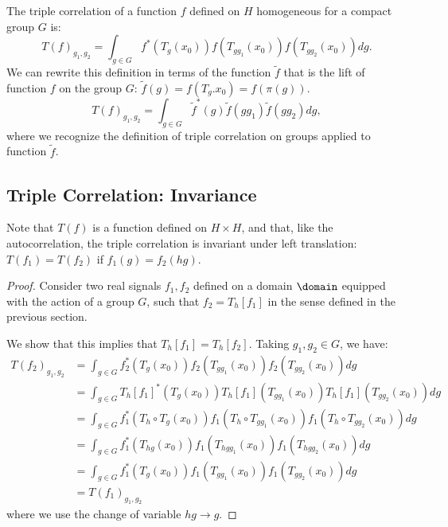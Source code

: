 \documentclass{article}
\begin{document}
The triple correlation of a function $f$ defined on $H$ homogeneous for a compact group $G$ is:
\begin{equation}
    T(f)_{g_1, g_2}
        =
        \int_{g \in G}
        f^*(T_g(x_0))
        f\left(T_{g g_1}(x_0)\right) f\left(T_{g g_2}(x_0)\right)
        dg .
\end{equation}
We can rewrite this definition in terms of the function $\tilde f$ that is the lift of function $f$ on the group $G$: $\tilde{f}(g) = f(T_g.x_0) = f(\pi(g))$.
\begin{equation}
    T(f)_{g_1, g_2}
        =
        \int_{g \in G}
        \tilde{f}^*(g)
        \tilde{f}(gg_1) \tilde{f}(gg_2)
        dg ,
\end{equation}
where we recognize the definition of triple correlation on groups applied to function $\tilde{f}$.

\subsection{Triple Correlation: Invariance}
Note that $T(f)$ is a function defined on $H \times H$, and that, like the autocorrelation, the triple correlation is invariant under left translation: $T(f_1)=T(f_2)$ if $f_1(g)=f_2(h g)$.

\begin{proof}
Consider two real signals $f_1, f_2$ defined on a domain $\domain$ equipped with the action of a group $G$, such that $f_2 = T_h[f_1]$ in the sense defined in the previous section.

We show that this implies that $T_h[f_1] = T_h[f_2] $. Taking $g_1, g_2 \in G$, we have:
\begin{align*}
    T(f_2)_{g_1, g_2}
        &= \int_{g \in G}
            f_2^*(T_g(x_0)) f_2\left(T_{g g_1}(x_0)\right) f_2\left(T_{g g_2}(x_0)\right) dg  \\
        &= \int_{g \in G}
            T_h[f_1]^*(T_g(x_0)) T_h[f_1]\left(T_{g g_1}(x_0)\right) T_h[f_1]\left(T_{g g_2}(x_0)\right) dg  \\
        &= \int_{g \in G}
            f_1^*(T_h \circ T_g(x_0)) f_1\left(T_h \circ T_{g g_1}(x_0)\right) f_1\left(T_h \circ T_{g g_2}(x_0)\right) dg  \\
        &= \int_{g \in G}
            f_1^*(T_{hg}(x_0)) f_1\left(T_{hg g_1}(x_0)\right) f_1\left(T_{hg g_2}(x_0)\right) dg  \\
        &= \int_{g \in G}
            f_1^*(T_{g}(x_0)) f_1\left(T_{g g_1}(x_0)\right) f_1\left(T_{g g_2}(x_0)\right) dg \\
        &= T(f_1)_{g_1, g_2}
\end{align*}
where we use the change of variable $hg \rightarrow g$.
\end{proof}
\end{document}
